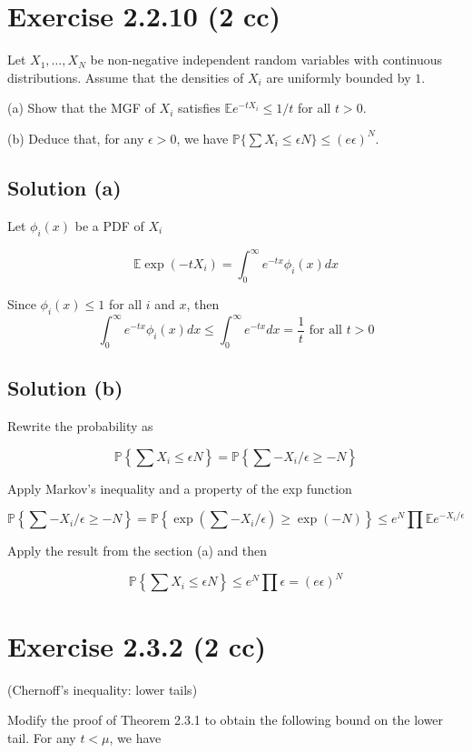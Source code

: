 \documentclass{article}
\begin{document}
\section{Exercise 2.2.10 (2 cc)}
Let $X_1, \dots , X_N$ be non-negative independent random variables with continuous distributions. Assume that the densities of $X_i$ are uniformly bounded by $1$.

(a) Show that the MGF of $X_i$ satisfies $\mathbb E e^{-tX_i} \leq 1/t$ for all $t>0$.

(b) Deduce that, for any $\epsilon > 0$, we have $\mathbb P\{\sum X_i \leq \epsilon N\} \leq (e\epsilon)^N$.

\subsection{Solution (a)}

Let $\phi_i(x)$ be a PDF of $X_i$

$$\mathbb E \exp(-tX_i) = \int_0^\infty e^{-tx} \phi_i(x) dx$$

Since $\phi_i(x) \leq 1$ for all $i$ and $x$, then
$$\int_0^\infty e^{-tx} \phi_i(x) dx \leq \int_0^\infty e^{-tx} dx = \frac{1}{t} \text{ for all } t>0$$

\subsection{Solution (b)}

Rewrite the probability as

$$\mathbb P \left\{\sum X_i \leq \epsilon N\right\} = \mathbb P \left\{\sum -X_i/\epsilon \geq -N\right\}$$

Apply Markov's inequality and a property of the exp function

$$\mathbb P \left\{\sum -X_i/\epsilon \geq -N\right\} = \mathbb P \left\{ \exp\left(\sum -X_i/\epsilon\right) \geq \exp(-N) \right\} \leq e^N\prod \mathbb E e^{-X_i/\epsilon}$$

Apply the result from the section (a) and then

$$\mathbb P \left\{\sum X_i \leq \epsilon N\right\} \leq e^N \prod \epsilon = (e\epsilon)^N$$

\section{Exercise 2.3.2 (2 cc)}

(Chernoff’s inequality: lower tails)

Modify the proof of Theorem 2.3.1 to obtain the following bound on the lower tail. For any $t < \mu$, we have
\end{document}
